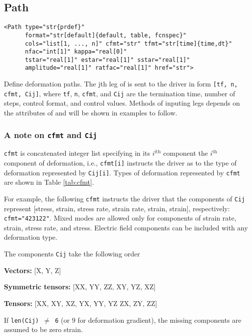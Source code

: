 \documentclass[11pt]{report}
\newcommand{\reqdtag}[1]{\Red{\texttt{<#1>}}}
\newcommand{\supporting}[1]{\texttt{Supporting Drivers: #1}}
\begin{document}
\subsection{Path}
\begin{verbatim}
<Path type="str{prdef}"
      format="str[default]{default, table, fcnspec}"
      cols="list[1, ..., n]" cfmt="str" tfmt="str[time]{time,dt}"
      nfac="int[1]" kappa="real[0]"
      tstar="real[1]" estar="real[1]" sstar="real[1]"
      amplitude="real[1]" ratfac="real[1]" href="str">
\end{verbatim}
%
Define deformation paths. The jth leg of \reqdtag{Path} is sent to the driver
in form \texttt{[tf, n, cfmt, Cij]}, where \texttt{tf}, \texttt{n},
\texttt{cfmt}, and \texttt{Cij} are the termination time, number of steps,
control format, and control values.  Methods of inputing legs depends on the
attributes of \reqdtag{Path} and will be shown in examples to follow.

\subsubsection{A note on \texttt{cfmt} and \texttt{Cij}}
\texttt{cfmt} is concatenated integer list specifying in its $i^\text{ith}$
component the $i^\text{th}$ component of deformation, i.e., \texttt{cfmt[i]}
instructs the driver as to the type of deformation represented by
\texttt{Cij[i]}.  Types of deformation represented by \texttt{cfmt} are shown
in Table \ref{tab:cfmt}.

For example, the following \texttt{cfmt} instructs the driver that the
components of \texttt{Cij} represent [stress, strain, stress rate, strain
rate, strain, strain], respectively: \verb|cfmt="423122"|. Mixed modes are
allowed only for components of strain rate, strain, stress rate, and stress.
Electric field components can be included with any deformation type.

The components \texttt{Cij} take the following order

\textbf{Vectors:} [X, Y, Z]

\textbf{Symmetric tensors:} [XX, YY, ZZ, XY, YZ, XZ]

\textbf{Tensors:} [XX, XY, XZ, YX, YY, YZ ZX, ZY, ZZ]

If \texttt{len(Cij) $\neq$ 6} (or 9 for deformation gradient), the missing
components are assumed to be zero strain.
\end{document}
